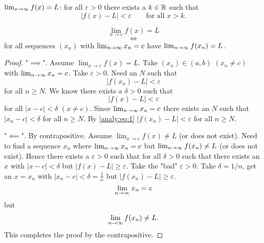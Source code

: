\documentclass[10pt, a4paper]{article}
\begin{document}
\begin{definition}
    $\liminfty[x] f(x) = L$:
    for all $\varepsilon > 0$ there exists a $k \in \R$ such that
    \[
    |f(x) - L| < \varepsilon\qquad\text{for all } x > k.
    \]
\end{definition}

\begin{proposition}
    \[
    \lim_{x \rightarrow c}f(x) = L
    \]
    \[
    \iff
    \]
    for all sequences $(x_n)$ with $\liminfty x_n = c$ have $\liminfty f(x_n) = L$.
    \begin{proof}
        "$\implies$".
        Assume $\lim_{x \rightarrow c}f(x) = L$.
        Take $(x_n) \in (a, b)$ $(x_n \neq c)$ with $\liminfty x_n = c$.
        Take $\varepsilon > 0$.
        Need an $N$ such that
        \[
        |f(x_n) - L| < \varepsilon
        \]
        for all $n \geq N$.
        We know there exists a $\delta > 0$ such that
        \begin{equation}\label{analy:eq:1}
            |f(x) - L| < \varepsilon
        \end{equation}
        for all $|x - c| < \delta$ $(x \neq c)$.
        Since $\liminfty x_n = c$ there exists an $N$ such that $|x_n - c| < \delta$ for all $n \geq N$.
        By \eqref{analy:eq:1} $|f(x_n) - L| < \varepsilon$ for all $n \geq N$.

        "$\impliedby$".
        By contrapositive.
        Assume $\lim_{x \rightarrow c}f(x) \neq L$
        (or does not exist).
        Need to find a sequence $x_n$ where $\liminfty x_n = c$ but $\liminfty f(x_n) \neq L$
        (or does not exist).
        Hence there exists a $\varepsilon > 0$ such that for all $\delta > 0$ such that there exists an $x$ with $|x - c| < \delta$ but $|f(x) - L| \geq \varepsilon$.
        Take the "bad" $\varepsilon > 0$.
        Take $\delta = 1 / n$,
        get an $x = x_n$ with $|x_n - c| < \delta = \frac{1}{n}$ but $|f(x_n) - L| \geq \varepsilon$.
        \[
        \liminfty x_n = c
        \]
        but
        \[
        \liminfty f(x_n) \neq L.
        \]
        This completes the proof by the contrapositive.
    \end{proof}
\end{proposition}
\end{document}
